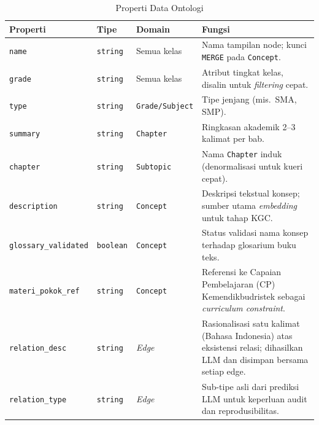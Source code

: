 \documentclass[main]{subfiles}
\begin{document}
\begin{table}[htbp]
  \centering
  \renewcommand{\arraystretch}{1.3}
  \caption{Properti Data Ontologi}
  \label{tab:data-properties}
  \begin{tabularx}{\textwidth}{@{}lll X@{}}
    \toprule
    \textbf{Properti} & \textbf{Tipe} & \textbf{Domain} & \textbf{Fungsi} \\
    \midrule
    \texttt{name}
      & \texttt{string} & Semua kelas
      & Nama tampilan node; kunci \texttt{MERGE} pada \texttt{Concept}. \\
    \texttt{grade}
      & \texttt{string} & Semua kelas
      & Atribut tingkat kelas, disalin untuk \textit{filtering} cepat. \\
    \texttt{type}
      & \texttt{string} & \texttt{Grade/Subject}
      & Tipe jenjang (mis.\ SMA, SMP). \\
    \texttt{summary}
      & \texttt{string} & \texttt{Chapter}
      & Ringkasan akademik 2--3 kalimat per bab. \\
    \texttt{chapter}
      & \texttt{string} & \texttt{Subtopic}
      & Nama \texttt{Chapter} induk (denormalisasi untuk kueri cepat). \\
    \texttt{description}
      & \texttt{string} & \texttt{Concept}
      & Deskripsi tekstual konsep; sumber utama \textit{embedding}
        untuk tahap KGC. \\
    \texttt{glossary\_validated}
      & \texttt{boolean} & \texttt{Concept}
      & Status validasi nama konsep terhadap glosarium buku teks. \\
    \texttt{materi\_pokok\_ref}
      & \texttt{string} & \texttt{Concept}
      & Referensi ke Capaian Pembelajaran (CP) Kemendikbudristek
        sebagai \textit{curriculum constraint}. \\
    \midrule
    \texttt{relation\_desc}
      & \texttt{string} & \textit{Edge}
      & Rasionalisasi satu kalimat (Bahasa Indonesia) atas eksistensi
        relasi; dihasilkan LLM dan disimpan bersama setiap edge. \\
    \texttt{relation\_type}
      & \texttt{string} & \textit{Edge}
      & Sub-tipe asli dari prediksi LLM untuk keperluan audit dan
        reprodusibilitas. \\
    \bottomrule
  \end{tabularx}
\end{table}
\end{document}
